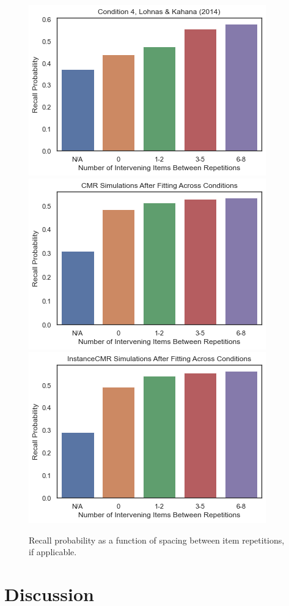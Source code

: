 \documentclass{article}
\begin{document}
\begin{figure}[h]
  \centering
  \includegraphics[width=.33\textwidth]{data_spacing.png} \includegraphics[width=.33\textwidth]{cmr_spacing.png} \includegraphics[width=.33\textwidth]{icmr_spacing.png}
  \caption{Recall probability as a function of spacing between item repetitions, if applicable.}
  \label{fig:LohnasSpacings}
\end{figure}

\section{Discussion}



\end{document}
